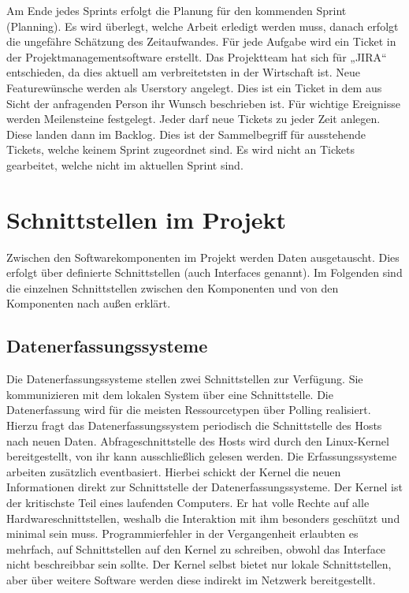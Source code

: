 Am Ende jedes Sprints erfolgt die Planung für den kommenden Sprint (Planning).
Es wird überlegt, welche Arbeit erledigt werden muss, danach erfolgt die
ungefähre Schätzung des Zeitaufwandes. Für jede Aufgabe wird ein Ticket in der
Projektmanagementsoftware erstellt. Das Projektteam hat sich für „JIRA“
entschieden, da dies aktuell am verbreitetsten in der Wirtschaft ist. Neue
Featurewünsche werden als Userstory angelegt. Dies ist ein Ticket in dem aus
Sicht der anfragenden Person ihr Wunsch beschrieben ist. Für wichtige
Ereignisse werden Meilensteine festgelegt. Jeder darf neue Tickets zu jeder
Zeit anlegen. Diese landen dann im \gls{Backlog}. Dies ist der Sammelbegriff
für ausstehende Tickets, welche keinem Sprint zugeordnet sind. Es wird nicht an
Tickets gearbeitet, welche nicht im aktuellen Sprint sind.
\tm%

\chapter{Schnittstellen im Projekt}
Zwischen den Softwarekomponenten im Projekt werden Daten ausgetauscht. Dies
erfolgt über definierte Schnittstellen (auch Interfaces genannt). Im Folgenden
sind die einzelnen Schnittstellen zwischen den Komponenten und von den
Komponenten nach außen erklärt.
\tm%

\section{Datenerfassungssysteme}
Die Datenerfassungssysteme stellen zwei Schnittstellen zur Verfügung. Sie
kommunizieren mit dem lokalen System über eine
 Schnittstelle. Die Datenerfassung wird
für die meisten Ressourcetypen über Polling realisiert. Hierzu fragt das
Datenerfassungssystem periodisch die Schnittstelle des Hosts nach neuen Daten.
Abfrageschnittstelle des Hosts wird durch den Linux\hyp{}Kernel bereitgestellt,
von ihr kann ausschließlich gelesen werden. Die Erfassungssysteme arbeiten
zusätzlich eventbasiert. Hierbei schickt der Kernel die neuen Informationen
direkt zur Schnittstelle der Datenerfassungssysteme. Der Kernel ist der
kritischste Teil eines laufenden Computers. Er hat volle Rechte auf alle
Hardwareschnittstellen, weshalb die Interaktion mit ihm besonders geschützt und
minimal sein muss. Programmierfehler in der Vergangenheit erlaubten es
mehrfach, auf Schnittstellen auf den Kernel zu schreiben, obwohl das Interface
nicht beschreibbar sein sollte. Der Kernel selbst bietet nur lokale
Schnittstellen, aber über weitere Software werden diese indirekt im Netzwerk
bereitgestellt.

